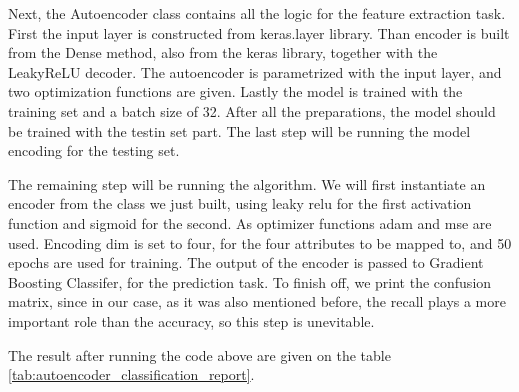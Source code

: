 \noindent Next, the Autoencoder class contains all the logic for the feature extraction task. First the input layer is constructed from keras.layer library. Than encoder is built from the Dense method, also from the keras library, together with the LeakyReLU decoder. The autoencoder is parametrized with the input layer, and two optimization functions are given. Lastly the model is trained with the training set and a batch size of 32. After all the preparations, the model should be trained with the testin set part. The last step will be running the model encoding for the testing set.

\vspace{0.5cm}

\vspace{0.5cm}

\noindent The remaining step will be running the algorithm.
We will first instantiate an encoder from the class we just built, using leaky relu for the first activation function and sigmoid for the second.
As optimizer functions adam and mse are used.
Encoding dim is set to four, for the four attributes to be mapped to, and 50 epochs are used for training.
The output of the encoder is passed to Gradient Boosting Classifer, for the prediction task.
To finish off, we print the confusion matrix, since in our case, as it was also mentioned before, the recall plays a more important role than the accuracy, so this step is unevitable.\\

\vspace{0.5cm}

\vspace{0.5cm}

\noindent The result after running the code above are given on the table \ref{tab:autoencoder_classification_report}.

